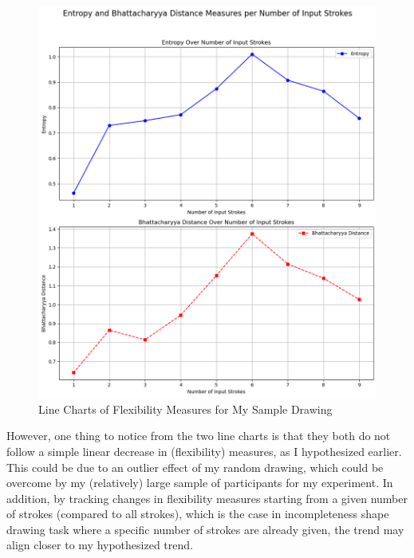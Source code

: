 \documentclass[../Proposal.tex]{subfiles}
\begin{document}
\begin{figure}[htbp]
    \centering
    \includegraphics[scale=0.7]{screenshots/Entropy and Bhattacharyya Distance Measures per Number of Input Strokes.png}
    \caption{Line Charts of Flexibility Measures for My Sample Drawing}
    \label{fig: Line Charts of Flexibility Measures for My Sample Drawing}
\end{figure}

However, one thing to notice from the two line charts is that they both do not follow a simple linear decrease in (flexibility) measures, as I hypothesized earlier. This could be due to an outlier effect of my random drawing, which could be overcome by my (relatively) large sample of participants for my experiment. In addition, by tracking changes in flexibility measures starting from a given number of strokes (compared to all strokes), which is the case in incompleteness shape drawing task where a specific number of strokes are already given, the trend may align closer to my hypothesized trend.
\end{document}
